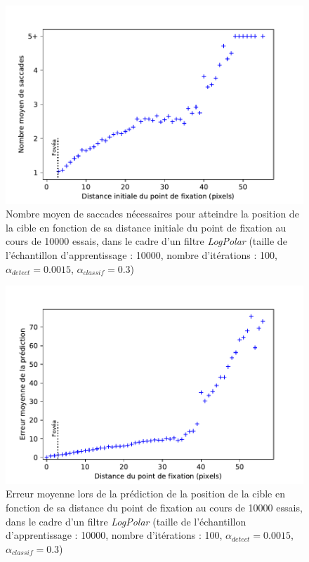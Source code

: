 \begin{figure}[th]
\centering
\includegraphics{Figures/logpolar_sacc_distance}
\decoRule
\caption[Figure]{Nombre moyen de saccades nécessaires pour atteindre la position de la cible en fonction de sa distance initiale du point de fixation au cours de 10000 essais, dans le cadre d'un filtre \textit{LogPolar} (taille de l'échantillon d'apprentissage :  10000, nombre d'itérations : 100, $\alpha_{detect}=0.0015$, $\alpha_{classif}=0.3$)}
\label{fig:sacc_distance}
\end{figure}

\begin{figure}[th]
\centering
\includegraphics[scale=0.95]{Figures/logpolar_err_distance}
\decoRule
\caption[Figure]{Erreur moyenne lors de la prédiction de la position de la cible en fonction de sa distance du point de fixation au cours de 10000 essais, dans le cadre d'un filtre \textit{LogPolar} (taille de l'échantillon d'apprentissage :  10000, nombre d'itérations : 100, $\alpha_{detect}=0.0015$, $\alpha_{classif}=0.3$)}
\label{fig:err_distance}
\end{figure}